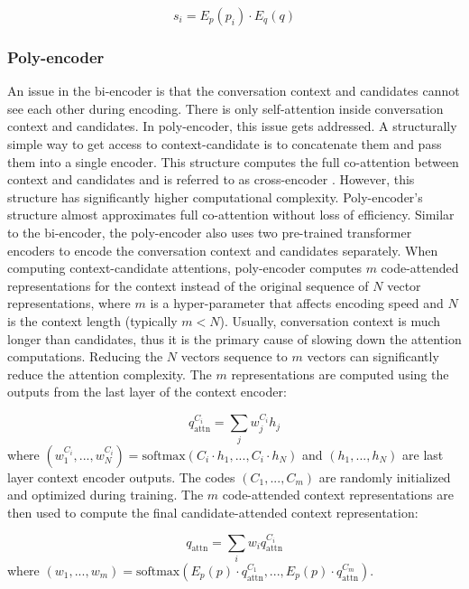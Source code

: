 \documentclass[format=acmsmall, review=False, screen=true]{acmart}
\begin{document}
\begin{equation}
s_{i} = E_p(p_i)\cdot E_q(q)
\end{equation}

\subsubsection{\textbf{Poly-encoder}}

An issue in the bi-encoder is that the conversation context and candidates cannot see each other during encoding. There is only self-attention inside conversation context and candidates. In poly-encoder, this issue gets addressed. A structurally simple way to get access to context-candidate is to concatenate them and pass them into a single encoder. This structure computes the full co-attention between context and candidates and is referred to as cross-encoder \cite{polyencoder}. However, this structure has significantly higher computational complexity. Poly-encoder's structure almost approximates full co-attention without loss of efficiency. Similar to the bi-encoder, the poly-encoder also uses two pre-trained transformer encoders to encode the conversation context and candidates separately. When computing context-candidate attentions, poly-encoder computes $m$ code-attended representations for the context instead of the original sequence of $N$ vector representations, where $m$ is a hyper-parameter that affects encoding speed and $N$ is the context length (typically $m<N$). Usually, conversation context is much longer than candidates, thus it is the primary cause of slowing down the attention computations. Reducing the $N$ vectors sequence to $m$ vectors can significantly reduce the attention complexity. The $m$ representations are computed using the outputs from the last layer of the context encoder:

\begin{equation}
q_{\text{attn}}^{C_i} = \sum_j w_j^{C_i}h_j 
\end{equation}
where $(w_1^{C_i},..., w_N^{C_i}) = \text{softmax}(C_i\cdot h_1, ..., C_i\cdot h_N)$ and $(h_1, ..., h_N)$ are last layer context encoder outputs. The codes $(C_1, ..., C_m)$ are randomly initialized and optimized during training. The $m$ code-attended context representations are then used to compute the final candidate-attended context representation:

\begin{equation}
q_{\text{attn}} = \sum_i w_iq_{\text{attn}}^{C_i}
\end{equation}
where $(w_1,..., w_m) = \text{softmax}(E_p(p)\cdot q_{\text{attn}}^{C_1}, ..., E_p(p)\cdot q_{\text{attn}}^{C_m})$.
\end{document}
